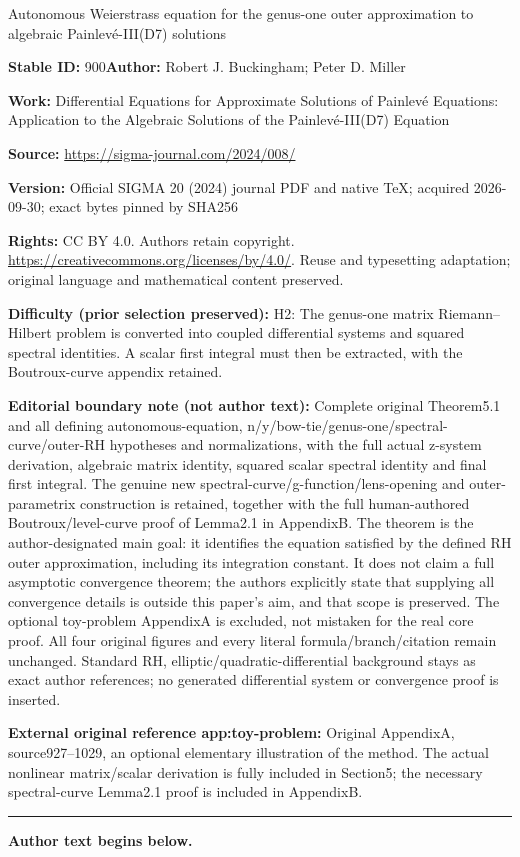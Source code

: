 \documentclass[11pt]{article}
\numberwithin{equation}{section}
\numberwithin{equation}{section}
\begin{document}
\begin{center}\Large Autonomous Weierstrass equation for the genus-one outer approximation to algebraic Painlevé-III(D7) solutions\end{center}
\noindent\textbf{Stable ID:} 900\quad\textbf{Author:} Robert J. Buckingham; Peter D. Miller\par
\noindent\textbf{Work:} Differential Equations for Approximate Solutions of Painlevé Equations: Application to the Algebraic Solutions of the Painlevé-III(D7) Equation\par
\noindent\textbf{Source:} \url{https://sigma-journal.com/2024/008/}\par
\noindent\textbf{Version:} Official SIGMA 20 (2024) journal PDF and native TeX; acquired 2026-09-30; exact bytes pinned by SHA256\par
\noindent\textbf{Rights:} CC BY 4.0. Authors retain copyright. \url{https://creativecommons.org/licenses/by/4.0/}. Reuse and typesetting adaptation; original language and mathematical content preserved.\par
\noindent\textbf{Difficulty (prior selection preserved):} {\CJKfont H2: The genus-one matrix Riemann–Hilbert problem is converted into coupled differential systems and squared spectral identities. A scalar first integral must then be extracted, with the Boutroux-curve appendix retained.}\par
\medskip\noindent\textbf{Editorial boundary note (not author text):} Complete original Theorem5.1 and all defining autonomous-equation, n/y/bow-tie/genus-one/spectral-curve/outer-RH hypotheses and normalizations, with the full actual z-system derivation, algebraic matrix identity, squared scalar spectral identity and final first integral. The genuine new spectral-curve/g-function/lens-opening and outer-parametrix construction is retained, together with the full human-authored Boutroux/level-curve proof of Lemma2.1 in AppendixB. The theorem is the author-designated main goal: it identifies the equation satisfied by the defined RH outer approximation, including its integration constant. It does not claim a full asymptotic convergence theorem; the authors explicitly state that supplying all convergence details is outside this paper’s aim, and that scope is preserved. The optional toy-problem AppendixA is excluded, not mistaken for the real core proof. All four original figures and every literal formula/branch/citation remain unchanged. Standard RH, elliptic/quadratic-differential background stays as exact author references; no generated differential system or convergence proof is inserted.\par
\noindent\textbf{External original reference app:toy-problem:} Original AppendixA, source927–1029, an optional elementary illustration of the method. The actual nonlinear matrix/scalar derivation is fully included in Section5; the necessary spectral-curve Lemma2.1 proof is included in AppendixB.\par
\medskip\hrule\medskip\noindent\textbf{Author text begins below.}\par
\end{document}
